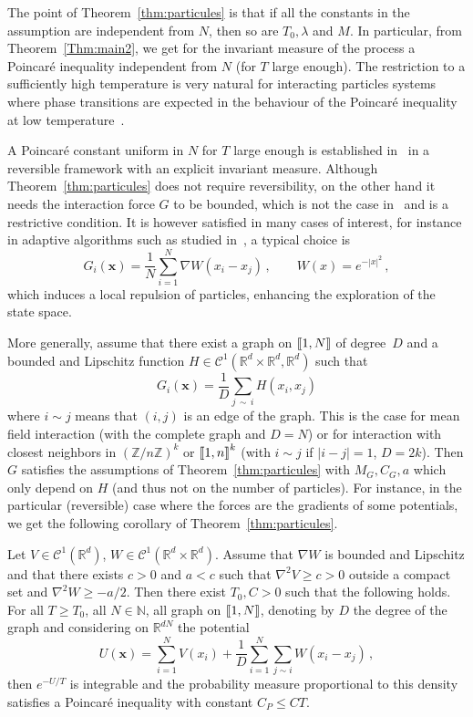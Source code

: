 \documentclass[10pt]{amsart}
\theoremstyle{definition}\newtheorem{defi}[theo]{Definition}\newtheorem{rema}[theo]{Remark}\newtheorem{exam}[theo]{Example}\newtheorem{exem}[theo]{Example}\newtheorem{nota}[theo]{Notation}
\newcommand{\llbracket}{\mathopen{[\mkern -2.7mu[}}
\newcommand{\rrbracket}{\mathclose{]\mkern -2.7mu]}}
\newcommand{\R}{\mathbb R}
\newcommand{\Z}{\mathbb Z}
\newcommand{\clC}{\mathcal C}
\newcommand{\N}{\mathbb N}
\newcommand{\na}{\nabla}
\newcommand{\1}{\mathbbm{1}}
\newcommand{\bx}{\mathbf{x}}
\providecommand{\llbracket}{\mathopen{[\mkern-2.7mu[}}\providecommand{\rrbracket}{\mathclose{]\mkern-2.7mu]}}
\begin{document}
The point of Theorem~\ref{thm:particules} is that if all the constants in the assumption are independent from $N$, then so are $T_0,\lambda$ and $M$. In particular, from Theorem~\ref{Thm:main2}, we get for the invariant measure of the process a Poincaré inequality independent from $N$ (for $T$ large enough). The restriction to a sufficiently high temperature is very natural for interacting particles systems where phase transitions are expected in the behaviour of the Poincaré inequality at low temperature~\cite{Tugaut2014}.


A Poincaré constant uniform in $N$ for $T$ large enough is established in~\cite{GuillinWuZhang} in a reversible framework with an explicit invariant measure. Although Theorem~\ref{thm:particules} does not require reversibility, on the other hand it needs the interaction force $G$ to be bounded, which is not the case in~\cite{GuillinWuZhang} and is a restrictive condition. It is however satisfied in many cases of interest, for instance in adaptive algorithms such as studied in~\cite{Clubdes5}, a typical choice is
\[
G_i(\bx) = \frac1N \sum_{i=1}^N \na W\left(x_i-x_j\right)\,,\qquad W(x) = e^{-|x|^2}\,,
\]
which induces a local repulsion of particles, enhancing the exploration of the state space.

More generally, assume that there exist a graph on $\llbracket 1,N\rrbracket$ of degree~$D$ and a bounded and Lipschitz function $H\in \clC^1(\R^d\times\R^d,\R^d)$ such that
\[
G_i(\bx) = \frac{1}{D}\sum_{j\,\sim\,i} H\left(x_i,x_j\right)
\]
where $i\sim j$ means that $(i,j)$ is an edge of the graph. This is the case for mean field interaction (with the complete graph and $D=N$) or for interaction with closest neighbors in $(\Z/n\Z)^k$ or $\llbracket 1,n\rrbracket^k$ (with $i\sim j$ if $|i-j|=1$, $D=2k$). Then $G$ satisfies the assumptions of Theorem~\ref{thm:particules} with $M_G,C_G,a$ which only depend on $H$ (and thus not on the number of particles). For instance, in the particular (reversible) case where the forces are the gradients of some potentials, we get the following corollary of Theorem~\ref{thm:particules}.


\begin{prop}
Let $V\in\clC^1(\R^d)$, $W\in\clC^1(\R^d\times\R^d)$. Assume that $\na W$ is bounded and Lipschitz and that there exists $c>0$ and $a<c$ such that $\na^2 V \geqslant c>0$ outside a compact set and $\na^2 W \geqslant -a/2$. Then there exist $T_0,C> 0$ such that the following holds. For all $T\geqslant T_0$, all $N\in\N$, all graph on $\llbracket 1,N\rrbracket$, denoting by $D$ the degree of the graph and considering on $\R^{dN}$ the potential
\[
U(\bx) = \sum_{i=1}^N V(x_i) + \frac{1}{D}\sum_{i=1}^N\sum_{j\sim i} W\left(x_i-x_j\right)\,,
\]
then $e^{-U/T}$ is integrable and the probability measure proportional to this density satisfies a Poincaré inequality with constant $C_P\leqslant CT$.
\end{prop}
\end{document}
